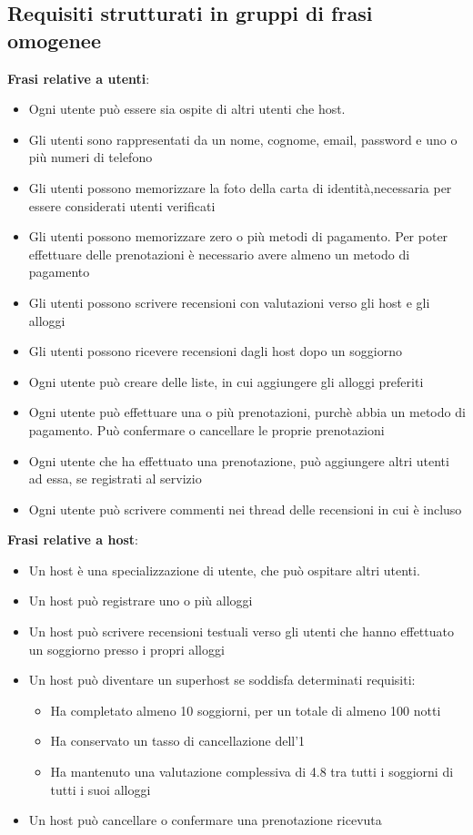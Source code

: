 \documentclass[letterpaper]{report}
\begin{document}
\subsection{Requisiti strutturati in gruppi di frasi omogenee}
\textbf{Frasi relative a utenti}:
\begin{itemize}
    \item Ogni utente può essere sia ospite di altri utenti che host.
    \item Gli utenti sono rappresentati da un nome, cognome, email, password e uno o più numeri di telefono
    \item Gli utenti possono memorizzare la foto della carta di identità,necessaria per essere considerati utenti verificati
    \item Gli utenti possono memorizzare zero o più metodi di pagamento. Per poter effettuare delle prenotazioni è necessario avere almeno un metodo di pagamento
    \item Gli utenti possono scrivere recensioni con valutazioni verso gli host e gli alloggi
    \item Gli utenti possono ricevere recensioni dagli host dopo un soggiorno
    \item Ogni utente può creare delle liste, in cui aggiungere gli alloggi preferiti
    \item Ogni utente può effettuare una o più prenotazioni, purchè abbia un metodo di pagamento. Può confermare o cancellare le proprie prenotazioni
    \item Ogni utente che ha effettuato una prenotazione, può aggiungere altri utenti ad essa, se registrati al servizio
    \item Ogni utente può scrivere commenti nei thread delle recensioni in cui è incluso \\
\end{itemize}
\bigskip
\textbf{Frasi relative a host}:
\begin{itemize}
    \item Un host è una specializzazione di utente, che può ospitare altri utenti.
    \item Un host può registrare uno o più alloggi
    \item Un host può scrivere recensioni testuali verso gli utenti che hanno effettuato un soggiorno presso i propri alloggi
    \item Un host può diventare un superhost se soddisfa determinati requisiti:
    \begin{itemize}
        \item Ha completato almeno 10 soggiorni, per un totale di almeno 100 notti
        \item Ha conservato un tasso di cancellazione dell'1%
        \item Ha mantenuto una valutazione complessiva di 4.8 tra tutti i soggiorni di tutti i suoi alloggi
    \end{itemize}
    \item Un host può cancellare o confermare una prenotazione ricevuta
\end{itemize}
\end{document}
